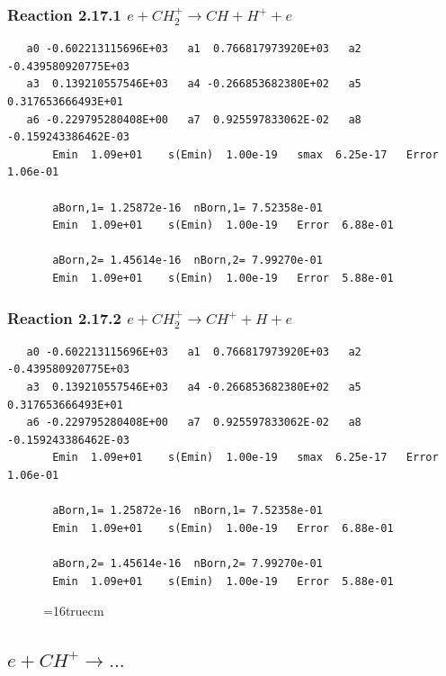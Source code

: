 \documentclass[12pt,dvipdfmx]{article}
\begin{document}
\subsubsection{
Reaction 2.17.1   $e + CH_2^+ \rightarrow CH + H^+ + e $
}

\begin{small}\begin{verbatim}
   a0 -0.602213115696E+03   a1  0.766817973920E+03   a2 -0.439580920775E+03
   a3  0.139210557546E+03   a4 -0.266853682380E+02   a5  0.317653666493E+01
   a6 -0.229795280408E+00   a7  0.925597833062E-02   a8 -0.159243386462E-03
       Emin  1.09e+01    s(Emin)  1.00e-19   smax  6.25e-17   Error  1.06e-01

       aBorn,1= 1.25872e-16  nBorn,1= 7.52358e-01
       Emin  1.09e+01    s(Emin)  1.00e-19   Error  6.88e-01

       aBorn,2= 1.45614e-16  nBorn,2= 7.99270e-01
       Emin  1.09e+01    s(Emin)  1.00e-19   Error  5.88e-01
\end{verbatim}\end{small}

\subsubsection{
Reaction 2.17.2   $e + CH_2^+ \rightarrow CH^+ + H + e $
}

\begin{small}\begin{verbatim}
   a0 -0.602213115696E+03   a1  0.766817973920E+03   a2 -0.439580920775E+03
   a3  0.139210557546E+03   a4 -0.266853682380E+02   a5  0.317653666493E+01
   a6 -0.229795280408E+00   a7  0.925597833062E-02   a8 -0.159243386462E-03
       Emin  1.09e+01    s(Emin)  1.00e-19   smax  6.25e-17   Error  1.06e-01

       aBorn,1= 1.25872e-16  nBorn,1= 7.52358e-01
       Emin  1.09e+01    s(Emin)  1.00e-19   Error  6.88e-01

       aBorn,2= 1.45614e-16  nBorn,2= 7.99270e-01
       Emin  1.09e+01    s(Emin)  1.00e-19   Error  5.88e-01
\end{verbatim}\end{small}

\begin{figure} \label{met.1_2.17}
\epsfxsize=16truecm
\end{figure}
\newpage

\subsection{
$e + CH^+ \rightarrow ... $
}
\end{document}

